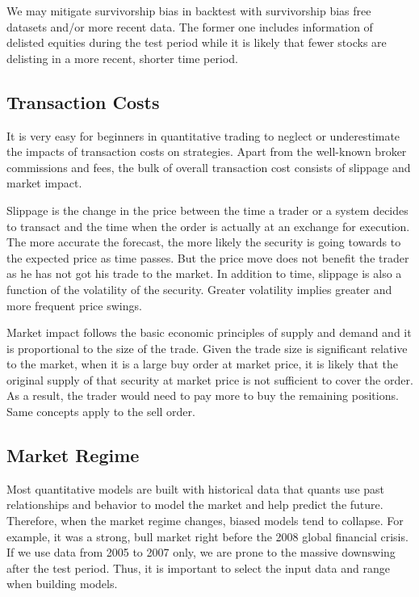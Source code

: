 \documentclass[12pt]{article}
\begin{document}
We may mitigate survivorship bias in backtest with survivorship bias free datasets and/or more recent data. The former one includes information of delisted equities during the test period while it is likely that fewer stocks are delisting in a more recent, shorter time period.

\subsection{Transaction Costs}

It is very easy for beginners in quantitative trading to neglect or underestimate the impacts of transaction costs on strategies. Apart from the well-known broker commissions and fees, the bulk of overall transaction cost consists of slippage and market impact.

Slippage is the change in the price between the time a trader or a system decides to transact and the time when the order is actually at an exchange for execution. The more accurate the forecast, the more likely the security is going towards to the expected price as time passes. But the price move does not benefit the trader as he has not got his trade to the market. In addition to time, slippage is also a function of the volatility of the security. Greater volatility implies greater and more frequent price swings.

Market impact follows the basic economic principles of supply and demand and it is proportional to the size of the trade. Given the trade size is significant relative to the market, when it is a large buy order at market price, it is likely that the original supply of that security at market price is not sufficient to cover the order. As a result, the trader would need to pay more to buy the remaining positions. Same concepts apply to the sell order.

\subsection{Market Regime}

Most quantitative models are built with historical data that quants use past relationships and behavior to model the market and help predict the future. Therefore, when the market regime changes, biased models tend to collapse. For example, it was a strong, bull market right before the 2008 global financial crisis. If we use data from 2005 to 2007 only, we are prone to the massive downswing after the test period. Thus, it is important to select the input data and range when building models.
\end{document}
